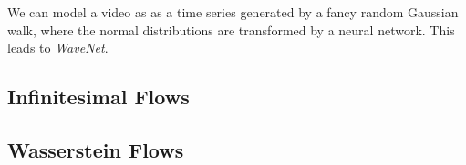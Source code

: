 \documentclass{article}
\begin{document}
  \begin{example}
    \label{ex:video-flows}
    We can model a video as as a time series generated by a fancy random Gaussian walk, where the normal distributions are transformed by a neural network. This leads to \textit{WaveNet}. 
  \end{example}

\subsection{Infinitesimal Flows} 

\subsection{Wasserstein Flows} 




\end{document}
